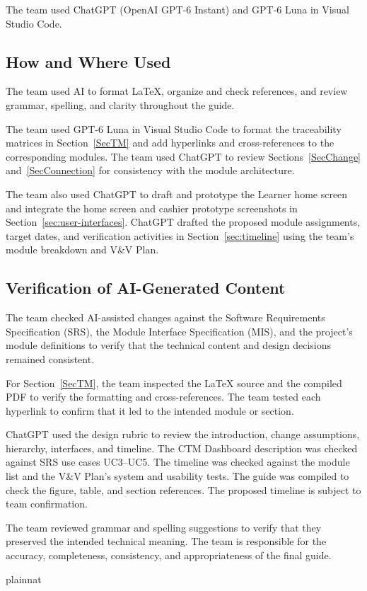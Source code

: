 \documentclass[12pt, titlepage]{article}
\begin{document}
The team used ChatGPT (OpenAI GPT-6 Instant) and GPT-6 Luna in Visual Studio
Code.

\subsection{How and Where Used}

The team used AI to format \LaTeX{}, organize and check references, and review
grammar, spelling, and clarity throughout the guide.

The team used GPT-6 Luna in Visual Studio Code to format the traceability
matrices in Section~\ref{SecTM} and add hyperlinks and cross-references to the
corresponding modules. The team used ChatGPT to review
Sections~\ref{SecChange} and~\ref{SecConnection} for consistency with the
module architecture.

The team also used ChatGPT to draft and prototype the Learner home screen
and integrate the home screen and cashier prototype screenshots in
Section~\ref{sec:user-interfaces}. ChatGPT drafted the proposed module
assignments, target dates, and verification activities in
Section~\ref{sec:timeline} using the team's module breakdown and V\&V Plan.

\subsection{Verification of AI-Generated Content}

The team checked AI-assisted changes against the Software Requirements
Specification (SRS), the Module Interface Specification (MIS), and the
project's module definitions to verify that the technical content and design
decisions remained consistent.

For Section~\ref{SecTM}, the team inspected the \LaTeX{} source and the
compiled PDF to verify the formatting and cross-references. The team tested
each hyperlink to confirm that it led to the intended module or section.

ChatGPT used the design rubric to review the introduction, change
assumptions, hierarchy, interfaces, and timeline. The CTM Dashboard description
was checked against SRS use cases UC3--UC5. The timeline was checked
against the module list and the V\&V Plan's system and usability tests.
The guide was compiled to check the figure, table, and section references.
The proposed timeline is subject to team confirmation.

The team reviewed grammar and spelling suggestions to verify that they
preserved the intended technical meaning. The team is responsible for the
accuracy, completeness, consistency, and appropriateness of the final guide.

\newpage{}

 {plainnat}

\end{document}
